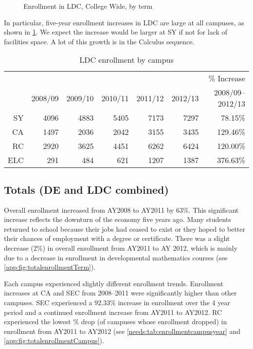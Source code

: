 \begin{figure}[!htb]
	\centering
	
	\caption{Enrollment in LDC, College Wide, by term}
	\label{needs:fig:enrollmentLDCTerm}
\end{figure}

In particular, five-year enrollment increases  in LDC are large at all
campuses, as shown in \cref{needs:tab:LDCenrollmentCampus}.  We expect the
increase would be larger at SY if not for lack of facilities space. A lot of
this growth is in the Calculus sequence.

\begin{table}[!htb]
	\centering
	\caption{LDC enrollment by campus}
	\label{needs:tab:LDCenrollmentCampus}
	\begin{tabular}{r*{6}{r}}
		\toprule
		    &         &         &         &         &         & \% Increase      \\
		    & 2008/09 & 2009/10 & 2010/11 & 2011/12 & 2012/13 & 2008/09--2012/13 \\
		\midrule
		SY  & 4096    & 4883    & 5405    & 7173    & 7297    & 78.15\%          \\
		CA  & 1497    & 2036    & 2042    & 3155    & 3435    & 129.46\%         \\
		RC  & 2920    & 3625    & 4451    & 6262    & 6424    & 120.00\%         \\
		ELC & 291     & 484     & 621     & 1207    & 1387    & 376.63\%         \\
		\bottomrule
	\end{tabular}
\end{table}

\subsection{Totals (DE and LDC combined)}
Overall enrollment increased from AY2008 to AY2011 by 63\%. This significant
increase reflects the downturn of the economy five years ago. Many students
returned to school because their jobs had ceased to exist or they hoped to
better their chances of employment with a degree or certificate. There was a
slight decrease (2\%) in overall enrollment from AY2011 to AY 2012, which is
mainly due to a decrease in enrollment in developmental mathematics courses
(see \vref{app:fig:totalenrollmentTerm}).


Each campus experienced slightly different enrollment trends. Enrollment
increases at CA and SEC from 2008--2011 were significantly higher than other
campuses. SEC experienced a 92.33\% increase in enrollment over the 4 year
period and a continued enrollment increase from AY2011 to AY2012. RC
experienced the lowest \% drop (of campuses whose enrollment dropped)  in
enrollment from AY2011 to AY2012 (see \vref{needs:tab:enrollmentcampusyear} and
\vref{app:fig:totalenrollmentCampus}).

